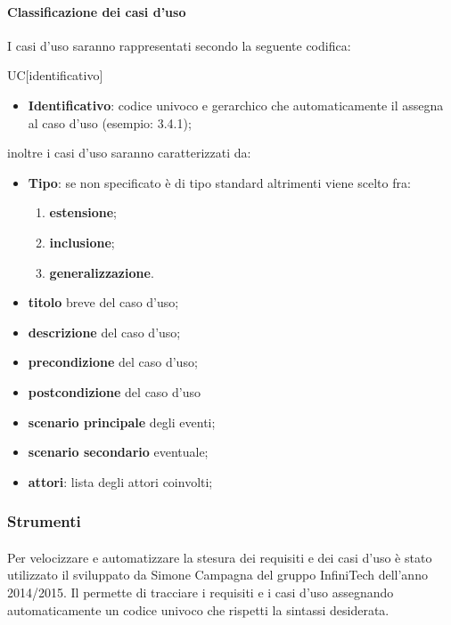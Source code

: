	\paragraph{Classificazione dei casi d'uso}
	\label{sec:2.1.2.2}
		I casi d'uso saranno rappresentati secondo la seguente codifica:
		\begin{center}
			UC[identificativo]
		\end{center}
		\begin{itemize}
			\item \textbf{Identificativo}: codice univoco e gerarchico che automaticamente il  assegna al caso d'uso (esempio: 3.4.1);
		\end{itemize}
		inoltre i casi d'uso saranno caratterizzati da:
		\begin{itemize}
			\item \textbf{Tipo}: se non specificato è di tipo standard altrimenti viene scelto fra:
			\begin{enumerate}
				\item \textbf{estensione};
				\item \textbf{inclusione};
				\item \textbf{generalizzazione}.
			\end{enumerate}
			\item \textbf{titolo} breve del caso d'uso;
			\item \textbf{descrizione} del caso d'uso;
			\item \textbf{precondizione} del caso d'uso;
			\item \textbf{postcondizione} del caso d'uso 
			\item \textbf{scenario principale} degli eventi;
			\item \textbf{scenario secondario} eventuale;
			\item \textbf{attori}: lista degli attori coinvolti;
		\end{itemize}
\subsubsection{Strumenti}
\label{sec:2.1.3}
	\paragraph{}
	\label{sec:2.1.3.1}
		Per velocizzare e automatizzare la stesura dei requisiti e dei casi d'uso è stato utilizzato il  \textbf{} sviluppato da Simone Campagna del gruppo InfiniTech dell'anno 2014/2015. Il  permette di tracciare i requisiti e i casi d'uso assegnando automaticamente un codice univoco che rispetti la sintassi desiderata.

